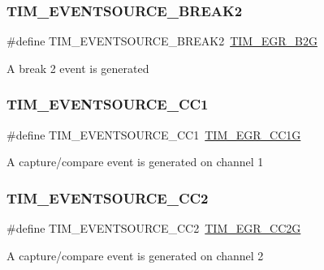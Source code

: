 \subsubsection{\texorpdfstring{TIM\_EVENTSOURCE\_BREAK2}{TIM\_EVENTSOURCE\_BREAK2}}
{\footnotesize\ttfamily \#define T\+I\+M\+\_\+\+E\+V\+E\+N\+T\+S\+O\+U\+R\+C\+E\+\_\+\+B\+R\+E\+A\+K2~\mbox{\hyperlink{group___peripheral___registers___bits___definition_ga42a7335ccbf7565d45b3efd51c213af2}{T\+I\+M\+\_\+\+E\+G\+R\+\_\+\+B2G}}}

A break 2 event is generated \mbox{\label{group___t_i_m___event___source_ga529eadf26cd17108dd95b9707a3d0f55}} 
\subsubsection{\texorpdfstring{TIM\_EVENTSOURCE\_CC1}{TIM\_EVENTSOURCE\_CC1}}
{\footnotesize\ttfamily \#define T\+I\+M\+\_\+\+E\+V\+E\+N\+T\+S\+O\+U\+R\+C\+E\+\_\+\+C\+C1~\mbox{\hyperlink{group___peripheral___registers___bits___definition_ga0a1318609761df5de5213e9e75b5aa6a}{T\+I\+M\+\_\+\+E\+G\+R\+\_\+\+C\+C1G}}}

A capture/compare event is generated on channel 1 \mbox{\label{group___t_i_m___event___source_ga12e3a98c601f4f288354ac2538050e6b}} 
\subsubsection{\texorpdfstring{TIM\_EVENTSOURCE\_CC2}{TIM\_EVENTSOURCE\_CC2}}
{\footnotesize\ttfamily \#define T\+I\+M\+\_\+\+E\+V\+E\+N\+T\+S\+O\+U\+R\+C\+E\+\_\+\+C\+C2~\mbox{\hyperlink{group___peripheral___registers___bits___definition_ga5423de00e86aeb8a4657a509af485055}{T\+I\+M\+\_\+\+E\+G\+R\+\_\+\+C\+C2G}}}

A capture/compare event is generated on channel 2 \mbox{\label{group___t_i_m___event___source_ga1c2faf942ab525b44299ddd0a6d848e4}} 
